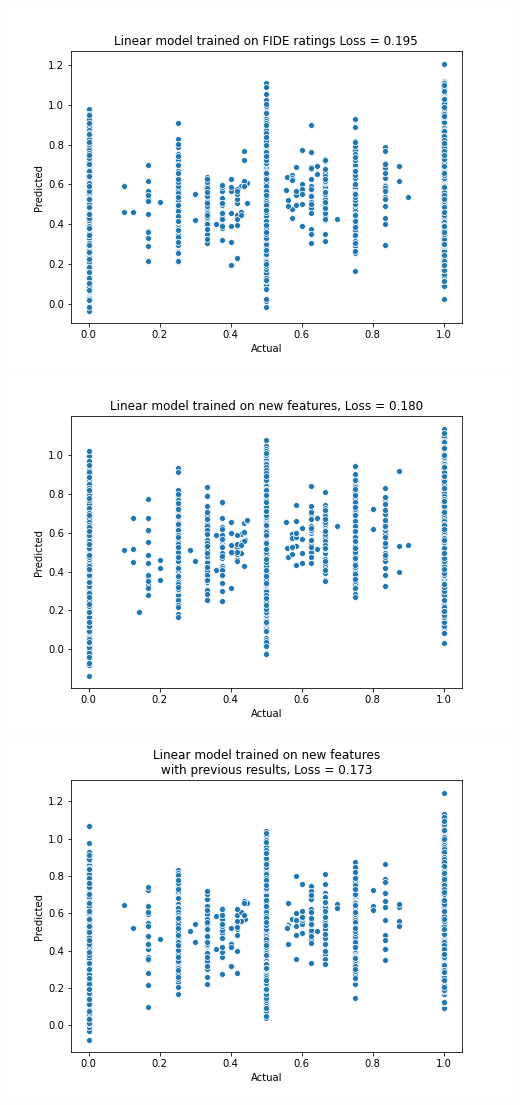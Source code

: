 \documentclass[12pt, letterpaper]{article}
\begin{document}
\setlength{\parskip}{0.0cm}

\begin{multicols}{2}

\includegraphics[width=\linewidth]{../figures/baseline_linear.png}
\includegraphics[width=\linewidth]{../figures/new_linear_iter_0.png}
\includegraphics[width=\linewidth]{../figures/new_linear_withprev_iter_0.png}


\end{multicols}
\end{document}
